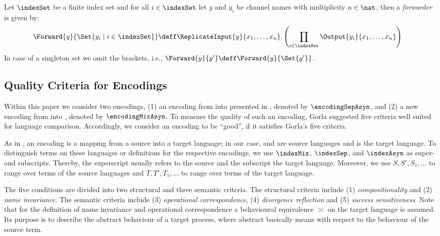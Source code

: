 \documentclass[]{llncs}
\begin{document}
\begin{definition}[Forwarder]
\label{def:forwarder}
	Let $ \indexSet $ be a finite index set and for all $ i \in \indexSet $ let $ y $ and $ y_i $ be channel names with multiplicity $ n \in \nat $, then a \emph{forwarder} is given by:
	\begin{align*}
		\Forward{y}{\Set{ y_i \mid i \in \indexSet }} & \deff \ReplicateInput{y}{x_1, \ldots, x_n}.\left( \prod_{i \in \indexSet} \Output{y_i}{x_1, \ldots, x_n} \right)
	\end{align*}
	In case of a singleton set we omit the brackets, i.e., $ \Forward{y}{y'} \deff \Forward{y}{\Set{ y' }} $.
\end{definition}

\subsection{Quality Criteria for Encodings}
\label{sec:qualityCriteria}

Within this paper we consider two encodings, (1) an encoding from \piSep into \piAsyn presented in \cite{nestmann00}, denoted by $ \encodingSepAsyn $, and (2) a new encoding from \piMix into \piAsyn, denoted by $ \encodingMixAsyn $. To measure the quality of such an encoding, Gorla \cite{gorla10} suggested five criteria well suited for language comparison. Accordingly, we consider an encoding to be ``good'', if it satisfies Gorla's five criteria.

As in \cite{gorla10}, an encoding is a mapping from a source into a target language; in our case, \piMix and \piSep are source languages and \piAsyn is the target language. To distinguish terms on these languages or definitions for the respective encodings, we use $ \indexMix $, $ \indexSep $, and $ \indexAsyn $ as super- and subscripts. Thereby, the superscript usually refers to the source and the subscript the target language. Moreover, we use $ S, S', S_1, \ldots $ to range over terms of the source languages and $ T, T', T_1, \ldots $ to range over terms of the target language.

The five conditions are divided into two structural and three semantic criteria. The structural criteria include (1) \emph{compositionality} and (2) \emph{name invariance}. The semantic criteria include (3) \emph{operational correspondence}, (4) \emph{divergence reflection} and (5) \emph{success sensitiveness}. Note that for the definition of name invariance and operational correspondence a behavioural equivalence $ \asymp $ on the target language is assumed. Its purpose is to describe the abstract behaviour of a target process, where abstract basically means with respect to the behaviour of the source term.
\end{document}
